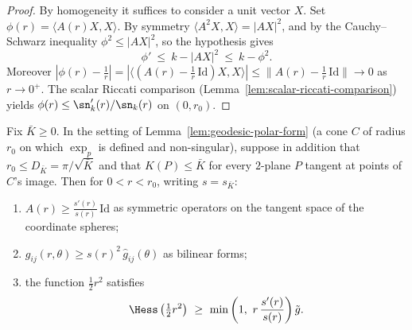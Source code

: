 \begin{proof}
\leanok
By homogeneity it suffices to consider a unit vector $X$. Set
$\phi(r)=\langle A(r)X,X\rangle$. By symmetry
$\langle A^2X,X\rangle=|AX|^2$, and by the Cauchy--Schwarz
inequality $\phi^2\le|AX|^2$, so the hypothesis gives
$$\phi'\ \le\ k-|AX|^2\ \le\ k-\phi^2 .$$
Moreover
$|\phi(r)-\tfrac1r|=|\langle(A(r)-\tfrac1r\,\mathrm{Id})X,X\rangle|
\le\|A(r)-\tfrac1r\,\mathrm{Id}\|\to0$ as $r\to0^+$. The scalar
Riccati comparison (Lemma~\ref{lem:scalar-riccati-comparison})
yields $\phi(r)\le\sn_k'(r)/\sn_k(r)$ on $(0,r_0)$.
\end{proof}

\begin{lemma}
\label{lem:rauch-lower}
Fix $\bar K\ge0$. In the setting of
Lemma~\ref{lem:geodesic-polar-form} (a cone $C$ of radius $r_0$ on
which $\exp_p$ is defined and non-singular), suppose in addition
that $r_0\le D_{\bar K}=\pi/\sqrt{\bar K}$ and that $K(P)\le\bar K$
for every $2$-plane $P$ tangent at points of $C$'s image. Then for
$0<r<r_0$, writing $s=s_{\bar K}$:
\begin{enumerate}
\item $A(r)\ge\frac{s'(r)}{s(r)}\,\mathrm{Id}$ as symmetric
operators on the tangent space of the coordinate spheres;
\item $g_{ij}(r,\theta)\ge s(r)^2\,\hat g_{ij}(\theta)$ as
bilinear forms;
\item the function $\frac12r^2$ satisfies
$$\Hess\left(\tfrac12r^2\right)\ \ge\
\min\left(1,\ r\,\frac{s'(r)}{s(r)}\right)\tilde g .$$
\end{enumerate}
\end{lemma}

